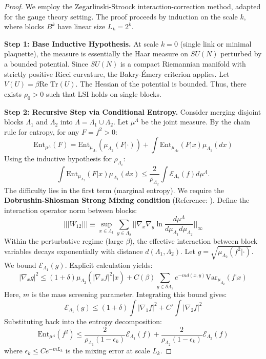 \begin{proof}
We employ the Zegarlinski-Stroock interaction-correction method, adapted for the gauge theory setting.
The proof proceeds by induction on the scale $k$, where blocks $B^k$ have linear size $L_k = 2^k$.

\textbf{Step 1: Base Inductive Hypothesis.}
At scale $k=0$ (single link or minimal plaquette), the measure is essentially the Haar measure on $SU(N)$ perturbed by a bounded potential. Since $SU(N)$ is a compact Riemannian manifold with strictly positive Ricci curvature, the Bakry-Émery criterion applies.
Let $V(U) = \beta \text{Re Tr}(U)$. The Hessian of the potential is bounded. Thus, there exists $\rho_0 > 0$ such that LSI holds on single blocks.

\textbf{Step 2: Recursive Step via Conditional Entropy.}
Consider merging disjoint blocks $\Lambda_1$ and $\Lambda_2$ into $\Lambda = \Lambda_1 \cup \Lambda_2$. Let $\mu^\Lambda$ be the joint measure.
By the chain rule for entropy, for any $F = f^2 > 0$:
\[
\mathrm{Ent}_{\mu^\Lambda}(F) = \mathrm{Ent}_{\mu_{\Lambda_1}}( \mu_{\Lambda_2}(F | \cdot) ) + \int \mathrm{Ent}_{\mu_{\Lambda_2}}(F | x) \mu_{\Lambda_1}(dx)
\]
Using the inductive hypothesis for $\rho_{\Lambda_i}$:
\[
\int \mathrm{Ent}_{\mu_{\Lambda_2}}(F | x) \mu_{\Lambda_1}(dx) \le \frac{2}{\rho_{\Lambda_2}} \int \mathcal{E}_{\Lambda_2}(f) d\mu^\Lambda.
\]
The difficulty lies in the first term (marginal entropy). We require the \textbf{Dobrushin-Shlosman Strong Mixing condition} (Reference: ).
Define the interaction operator norm between blocks:
\[
|||W_{12}||| \equiv \sup_{x \in \Lambda_1} \sum_{y \in \Lambda_2} || \nabla_x \nabla_y \ln \frac{d\mu^\Lambda}{d\mu_{\Lambda_1} d\mu_{\Lambda_2}} ||_{\infty}
\]
Within the perturbative regime (large $\beta$), the effective interaction between block variables decays exponentially with distance $d(\Lambda_1, \Lambda_2)$.
Let $g = \sqrt{\mu_{\Lambda_2}(f^2 | \cdot)}$. We bound $\mathcal{E}_{\Lambda_1}(g)$.
Explicit calculation yields:
\[
|\nabla_x g|^2 \le (1 + \delta) \mu_{\Lambda_2}( |\nabla_x f|^2 | x ) + C(\beta) \sum_{y \in \partial \Lambda_2} e^{-m d(x,y)} \mathrm{Var}_{\mu_{\Lambda_2}}(f | x)
\]
Here, $m$ is the mass screening parameter.
Integrating this bound gives:
\[
\mathcal{E}_{\Lambda_1}(g) \le (1+\delta) \int |\nabla_1 f|^2 + C' \int |\nabla_2 f|^2
\]
Substituting back into the entropy decomposition:
\[
\mathrm{Ent}_{\mu^\Lambda}(f^2) \le \frac{2}{\rho_{\Lambda_1}(1 - \epsilon_k)} \mathcal{E}_{\Lambda_1}(f) + \frac{2}{\rho_{\Lambda_2}(1 - \epsilon_k)} \mathcal{E}_{\Lambda_2}(f)
\]
where $\epsilon_k \le C e^{-m L_k}$ is the mixing error at scale $L_k$.


\end{proof}
